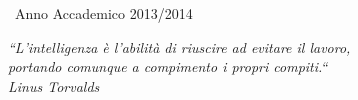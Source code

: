 \documentclass[11pt, oneside]{Thesis} %
\begin{document}
\begin{titlepage}
\begin{center}
 \
{\large Anno Accademico 2013/2014}\\[4cm] %
 
\vfill
\end{center}

\end{titlepage}
  

\clearpage %


\pagestyle{empty} %

\null\vfill %

\begin{flushleft}

\textit{``L'intelligenza è l'abilità di riuscire ad evitare il lavoro,\\
   portando comunque a compimento i propri compiti.``\\
   Linus Torvalds}
\end{flushleft}

\vfill
\vfill
\vfill

\vfill
\vfill
\vfill
\vfill
\null %

\clearpage %


\end{document}
